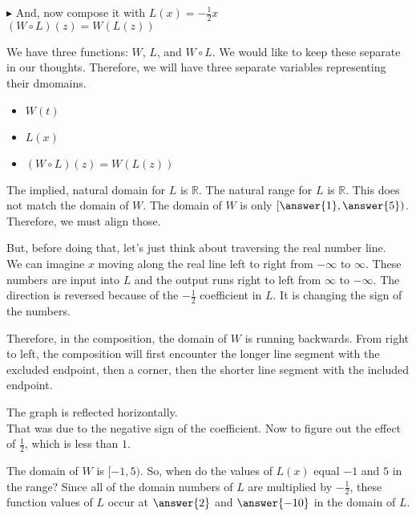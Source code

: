 \documentclass{ximera}
\begin{document}
$\blacktriangleright$ And, now compose it with $L(x) = -\frac{1}{2}x$ \\



$(W \circ L)(z) = W(L(z))$



\begin{explanation}

We have three functions: $W$, $L$, and $W \circ L$.  We would like to keep these separate in our thoughts.  Therefore, we will have three separate variables representing their dmomains.


\begin{itemize}
\item $W(t)$
\item $L(x)$
\item $(W \circ L)(z) = W(L(z))$
\end{itemize}

\end{explanation}






The implied, natural domain for $L$ is \textbf{$\mathbb{R}$}.  The natural range for $L$ is \textbf{$\mathbb{R}$}. This does not match the domain of $W$.  The domain of $W$ is only $\left[ \answer{1}, \answer{5} \right)$. Therefore, we must align those.

But, before doing that, let's just think about traversing the real number line. \\

We can imagine $x$ moving along the real line left to right from $-\infty$ to $\infty$. These numbers are input into $L$ and the output runs right to left from $\infty$ to $-\infty$.  The direction is reversed because of the $-\frac{1}{2}$ coefficient in $L$.  It is changing the sign of the numbers.


Therefore, in the composition, the domain of $W$ is running backwards.  From right to left, the composition will first encounter the longer line segment with the excluded endpoint, then a corner, then the shorter line segment with the included endpoint.

The graph is reflected horizontally. \\


That was due to the negative sign of the coefficient.  Now to figure out the effect of $\frac{1}{2}$, which is less than $1$.


The domain of $W$ is $[-1, 5)$.  So, when do the values of $L(x)$ equal $-1$ and $5$ in the range?  Since all of the domain numbers of $L$ are multiplied by $-\frac{1}{2}$, these function values of $L$ occur at $\answer{2}$ and $\answer{-10}$ in the domain of $L$. \\
\end{document}
